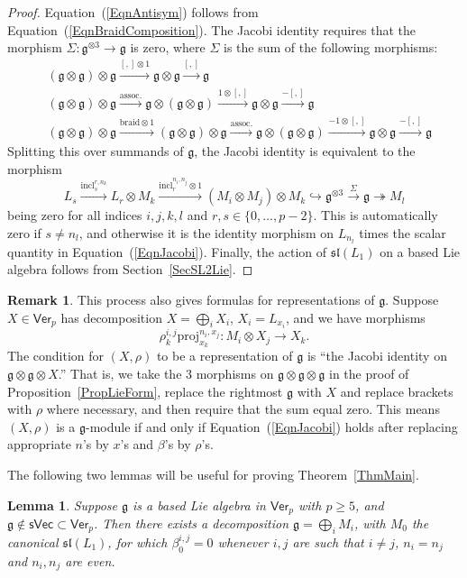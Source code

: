 \documentclass[11pt,a4paper,reqno]{amsart}
\newtheorem{lemma}[theorem]{Lemma}
\theoremstyle{definition}
\newtheorem{remark}[theorem]{Remark}
\numberwithin{equation}{section}
\newcommand{\Ver}{\mathsf{Ver}}
\newcommand{\fg}{\mathfrak{g}}
\newcommand{\fsl}{\mathfrak{sl}}
\newcommand{\sVec}{\mathsf{sVec}}
\newcommand{\incl}{\mathrm{incl}}
\newcommand{\proj}{\mathrm{proj}}
\begin{document}
\begin{proof}
Equation~(\ref{EqnAntisym}) follows from Equation~(\ref{EqnBraidComposition}). The Jacobi identity requires that the morphism $\Sigma:\fg^{\otimes3}\to\fg$ is zero, where $\Sigma$ is the sum of the following morphisms:
\begin{align*}
&(\fg\otimes\fg)\otimes\fg\xrightarrow{[,]\otimes1}\fg\otimes\fg\xrightarrow{[,]}\fg\\
&(\fg\otimes\fg)\otimes\fg\xrightarrow{\text{assoc.}}\fg\otimes(\fg\otimes\fg)\xrightarrow{1\otimes[,]}\fg\otimes\fg\xrightarrow{-[,]}\fg\\
&(\fg\otimes\fg)\otimes\fg\xrightarrow{\text{braid}\otimes1}(\fg\otimes\fg)\otimes\fg\xrightarrow{\text{assoc.}}\fg\otimes(\fg\otimes\fg)\xrightarrow{-1\otimes[,]}\fg\otimes\fg\xrightarrow{-[,]}\fg
\end{align*}
Splitting this over summands of $\fg$, the Jacobi identity is equivalent to the morphism
\[L_s\xrightarrow{\incl_s^{r,n_k}} L_r\otimes M_k\xrightarrow{\incl_r^{n_i,n_j}\otimes1}(M_i\otimes M_j)\otimes M_k\hookrightarrow\fg^{\otimes3}\xrightarrow{\Sigma}\fg\twoheadrightarrow M_l\]
being zero for all indices $i,j,k,l$ and $r,s\in\{0,\dots,p-2\}$. This is automatically zero if $s\neq n_l$, and otherwise it is the identity morphism on $L_{n_l}$ times the scalar quantity in Equation~(\ref{EqnJacobi}). Finally, the action of $\fsl(L_1)$ on a based Lie algebra follows from Section~\ref{SecSL2Lie}.
\end{proof}

\begin{remark}
This process also gives formulas for representations of $\fg$. Suppose $X\in\Ver_p$ has decomposition $X=\bigoplus_i X_i$, $X_i=L_{x_i}$, and we have morphisms
\[\rho_k^{i,j}\proj_{x_k}^{n_i,x_j}:M_i\otimes X_j\to X_k.\]
The condition for $(X,\rho)$ to be a representation of $\fg$ is ``the Jacobi identity on $\fg\otimes\fg\otimes X$.'' That is, we take the 3 morphisms on $\fg\otimes\fg\otimes\fg$ in the proof of Proposition~\ref{PropLieForm}, replace the rightmost $\fg$ with $X$ and replace brackets with $\rho$ where necessary, and then require that the sum equal zero. This means $(X,\rho)$ is a $\fg$-module if and only if Equation~(\ref{EqnJacobi}) holds after replacing appropriate $n$'s by $x$'s and $\beta$'s by $\rho$'s.
\end{remark}

The following two lemmas will be useful for proving Theorem~\ref{ThmMain}.

\begin{lemma}\label{LemGoodDecomp}
Suppose $\fg$ is a based Lie algebra in $\Ver_p$ with $p\geq5$, and $\fg\not\in\sVec\subset\Ver_p$. Then there exists a decomposition $\fg=\bigoplus_i M_i$, with $M_0$ the canonical $\fsl(L_1)$, for which $\beta^{i,j}_0=0$ whenever $i,j$ are such that $i\neq j$, $n_i=n_j$ and $n_i,n_j$ are even.
\end{lemma}
\end{document}
